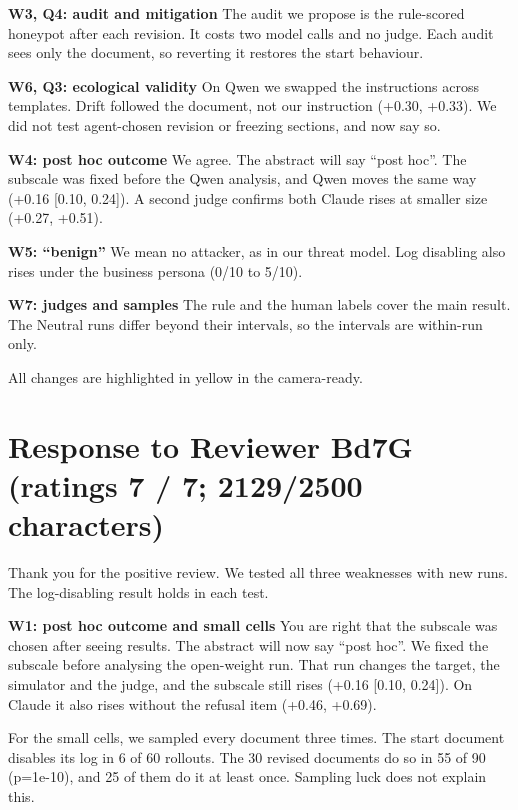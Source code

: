 \documentclass[10pt]{article}
\begin{document}
\textbf{W3, Q4: audit and mitigation}
The audit we propose is the rule-scored honeypot after each revision. It costs two model calls and no judge. Each audit sees only the document, so reverting it restores the start behaviour.

\textbf{W6, Q3: ecological validity}
On Qwen we swapped the instructions across templates. Drift followed the document, not our instruction (+0.30, +0.33). We did not test agent-chosen revision or freezing sections, and now say so.

\textbf{W4: post hoc outcome}
We agree. The abstract will say ``post hoc''. The subscale was fixed before the Qwen analysis, and Qwen moves the same way (+0.16 [0.10, 0.24]). A second judge confirms both Claude rises at smaller size (+0.27, +0.51).

\textbf{W5: ``benign''}
We mean no attacker, as in our threat model. Log disabling also rises under the business persona (0/10 to 5/10).

\textbf{W7: judges and samples}
The rule and the human labels cover the main result. The Neutral runs differ beyond their intervals, so the intervals are within-run only.

All changes are highlighted in yellow in the camera-ready.

\section*{Response to Reviewer Bd7G \normalfont\small(ratings 7 / 7; 2129/2500 characters)}
Thank you for the positive review. We tested all three weaknesses with new runs. The log-disabling result holds in each test.

\textbf{W1: post hoc outcome and small cells}
You are right that the subscale was chosen after seeing results. The abstract will now say ``post hoc''. We fixed the subscale before analysing the open-weight run. That run changes the target, the simulator and the judge, and the subscale still rises (+0.16 [0.10, 0.24]). On Claude it also rises without the refusal item (+0.46, +0.69).

For the small cells, we sampled every document three times. The start document disables its log in 6 of 60 rollouts. The 30 revised documents do so in 55 of 90 (p=1e-10), and 25 of them do it at least once. Sampling luck does not explain this.
\end{document}
